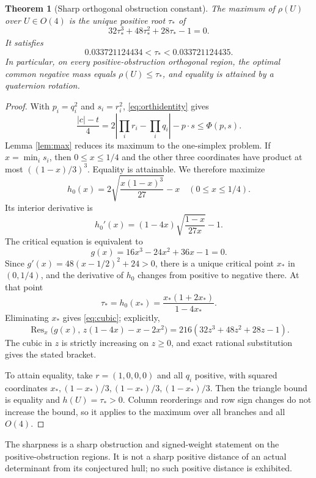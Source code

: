 \documentclass[11pt,a4paper]{article}
\newtheorem{theorem}{Theorem}[section]
\begin{document}
\begin{theorem}[Sharp orthogonal obstruction constant]\label{thm:sharp}
The maximum of $\rho(U)$ over $U\in O(4)$ is the unique positive root $\tau_*$ of
\begin{equation}\label{eq:cubic}
32\tau_*^3+48\tau_*^2+28\tau_*-1=0.
\end{equation}
It satisfies
\[
0.033721124434<\tau_*<0.033721124435.
\]
In particular, on every positive-obstruction orthogonal region, the optimal common negative mass equals $\rho(U)\le\tau_*$, and equality is attained by a quaternion rotation.
\end{theorem}
\begin{proof}
With $p_i=q_i^2$ and $s_i=r_i^2$, \eqref{eq:orthidentity} gives
\[
\frac{|c|-t}{4}
=2\left|\prod_i r_i-\prod_iq_i\right|-p\cdot s
\le\Phi(p,s).
\]
Lemma \ref{lem:max} reduces its maximum to the one-simplex problem. If $x=\min_i s_i$, then $0\le x\le1/4$ and the other three coordinates have product at most $((1-x)/3)^3$. Equality is attainable. We therefore maximize
\[
h_0(x)=2\sqrt{\frac{x(1-x)^3}{27}}-x\quad(0\le x\le1/4).
\]
Its interior derivative is
\[
h_0'(x)=(1-4x)\sqrt{\frac{1-x}{27x}}-1.
\]
The critical equation is equivalent to
\[
g(x)=16x^3-24x^2+36x-1=0.
\]
Since $g'(x)=48(x-1/2)^2+24>0$, there is a unique critical point $x_*$ in $(0,1/4)$, and the derivative of $h_0$ changes from positive to negative there. At that point
\[
\tau_*=h_0(x_*)=\frac{x_*(1+2x_*)}{1-4x_*}.
\]
Eliminating $x_*$ gives \eqref{eq:cubic}; explicitly,
\[
\operatorname{Res}_x\bigl(g(x),\,z(1-4x)-x-2x^2\bigr)
=216(32z^3+48z^2+28z-1).
\]
The cubic in $z$ is strictly increasing on $z\ge0$, and exact rational substitution gives the stated bracket.

To attain equality, take $r=(1,0,0,0)$ and all $q_i$ positive, with squared coordinates $x_*,(1-x_*)/3,(1-x_*)/3,(1-x_*)/3$. Then the triangle bound is equality and $h(U)=\tau_*>0$. Column reorderings and row sign changes do not increase the bound, so it applies to the maximum over all branches and all $O(4)$.
\end{proof}
The sharpness is a sharp obstruction and signed-weight statement on the positive-obstruction regions. It is not a sharp positive distance of an actual determinant from its conjectured hull; no such positive distance is exhibited.
\end{document}
